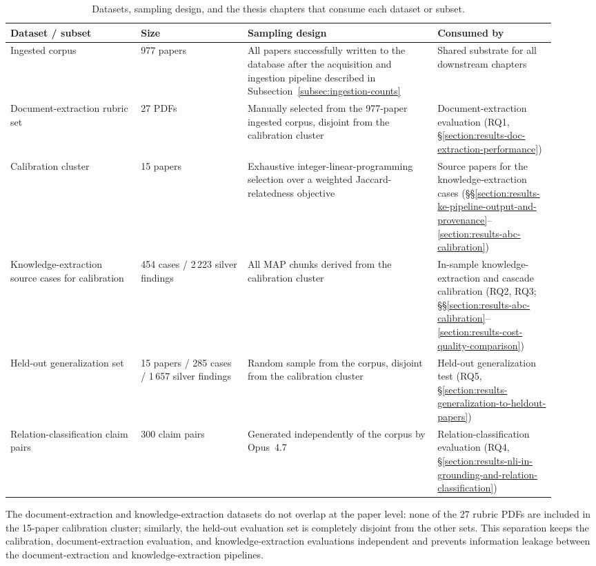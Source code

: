 \begin{table}[htpb]
  \caption[Dataset-purpose mapping]{Datasets, sampling design, and the thesis chapters that consume each dataset or subset.}
  \label{tab:dataset-purpose-mapping}
  \centering
  \begin{tabular}{p{0.22\linewidth} p{0.18\linewidth} p{0.32\linewidth} p{0.20\linewidth}}
    \toprule
    Dataset / subset & Size & Sampling design & Consumed by \\
    \midrule
    Ingested corpus
    & 977 papers
    & All papers successfully written to the database after the acquisition and ingestion pipeline described in Subsection~\ref{subsec:ingestion-counts}
    & Shared substrate for all downstream chapters \\
    
    Document-extraction rubric set
    & 27 PDFs
    & Manually selected from the 977-paper ingested corpus, disjoint from the calibration cluster
    & Document-extraction evaluation (RQ1, §\ref{section:results-doc-extraction-performance}) \\
    
    Calibration cluster
    & 15 papers
    & Exhaustive integer-linear-programming selection over a weighted Jaccard-relatedness objective
    & Source papers for the knowledge-extraction cases (§§\ref{section:results-ke-pipeline-output-and-provenance}--\ref{section:results-abc-calibration}) \\
    
    Knowledge-extraction source cases for calibration
    & 454 cases / 2\,223 silver findings
    & All MAP chunks derived from the calibration cluster
    & In-sample knowledge-extraction and cascade calibration (RQ2, RQ3; §§\ref{section:results-abc-calibration}--\ref{section:results-cost-quality-comparison}) \\
    
    Held-out generalization set
    & 15 papers / 285 cases / 1\,657 silver findings
    & Random sample from the corpus, disjoint from the calibration cluster 
    & Held-out generalization test (RQ5, §\ref{section:results-generalization-to-heldout-papers}) \\
    
    Relation-classification claim pairs
    & 300 claim pairs
    & Generated independently of the corpus by Opus~4.7
    & Relation-classification evaluation (RQ4, §\ref{section:results-nli-in-grounding-and-relation-classification}) \\
    \bottomrule
  \end{tabular}
\end{table}

The document-extraction and knowledge-extraction datasets do not overlap at the paper level: none of the 27 rubric PDFs are included in the 15-paper calibration cluster; similarly, the held-out evaluation set is completely disjoint from the other sets. This separation keeps the calibration, document-extraction evaluation, and knowledge-extraction evaluations independent and prevents information leakage between the document-extraction and knowledge-extraction pipelines.